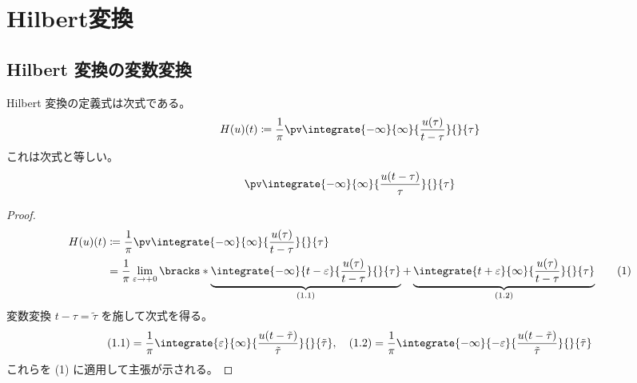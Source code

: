 \part{Hilbert変換}
    \newcommand{\HilbertTransform}[1]{\mathrm{H}\parens*{#1}}
    \chapter{Hilbert 変換の変数変換}
        \label{Hilbert 変換の変数変換}
        \begin{shadebox}
            Hilbert 変換の定義式は次式である。
            \[ H(u)(t)\coloneq\frac{1}{\pi}\pv\integrate{-\infty}{\infty}{\frac{u(\tau)}{t-\tau}}{}{\tau} \]
            これは次式と等しい。
            \[ \pv\integrate{-\infty}{\infty}{\frac{u(t-\tau)}{\tau}}{}{\tau} \]
        \end{shadebox}
        \begin{proof}
            \quad\par
            \begin{align*}
                H(u)(t) &\coloneq\frac{1}{\pi}\pv\integrate{-\infty}{\infty}{\frac{u(\tau)}{t-\tau}}{}{\tau} \\
                &= \frac{1}{\pi}\lim_{\varepsilon\to +0}\bracks*{\underbrace{\integrate{-\infty}{t-\varepsilon}{\frac{u(\tau)}{t-\tau}}{}{\tau}}_{(1.1)} + \underbrace{\integrate{t+\varepsilon}{\infty}{\frac{u(\tau)}{t-\tau}}{}{\tau}}_{(1.2)}} \tag{1}
            \end{align*}
            変数変換 $t-\tau = \tilde{\tau}$ を施して次式を得る。
            \[ (1.1) = \frac{1}{\pi}\integrate{\varepsilon}{\infty}{\frac{u(t-\tilde{\tau})}{\tilde{\tau}}}{}{\tilde{\tau}},\quad (1.2) = \frac{1}{\pi}\integrate{-\infty}{-\varepsilon}{\frac{u(t-\tilde{\tau})}{\tilde{\tau}}}{}{\tilde{\tau}} \]
            これらを (1) に適用して主張が示される。
        \end{proof}

